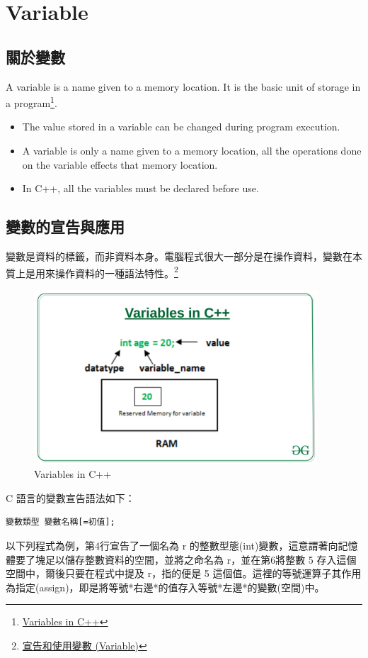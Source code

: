 \documentclass[12pt,a4paper]{article}
\begin{document}
\section{Variable}
\label{cpp_variables}
\subsection{關於變數}
\label{sec:orga184442}
A variable is a name given to a memory location. It is the basic unit of storage in a program\footnote{\href{https://www.geeksforgeeks.org/variables-in-c/}{Variables in C++}}.
\begin{itemize}
\item The value stored in a variable can be changed during program execution.
\item A variable is only a name given to a memory location, all the operations done on the variable effects that memory location.
\item In C++, all the variables must be declared before use.
\end{itemize}

\subsection{\label{VarDec}變數的宣告與應用}
\label{sec:orgbc0f4b8}
變數是資料的標籤，而非資料本身。電腦程式很大一部分是在操作資料，變數在本質上是用來操作資料的一種語法特性。\footnote{\href{https://michaelchen.tech/c-programming/variable/}{宣告和使用變數 (Variable)}}
\begin{figure}[htbp]
\centering
\includegraphics[width=400]{images/Variables-in-C-1.jpg}
\caption{\label{fig:vic}Variables in C++}
\end{figure}

C 語言的變數宣告語法如下：
\lstset{breaklines=true,language=:eval,label= ,caption= ,captionpos=b,numbers=none}
\begin{lstlisting}
變數類型 變數名稱[=初值];
\end{lstlisting}
以下列程式為例，第4行宣告了一個名為 r 的整數型態(int)變數，這意謂著向記憶體要了塊足以儲存整數資料的空間，並將之命名為 r，並在第6將整數 5 存入這個空間中，爾後只要在程式中提及 r，指的便是 5 這個值。這裡的等號運算子其作用為指定(assign)，即是將等號*右邊*的值存入等號*左邊*的變數(空間)中。
\end{document}
